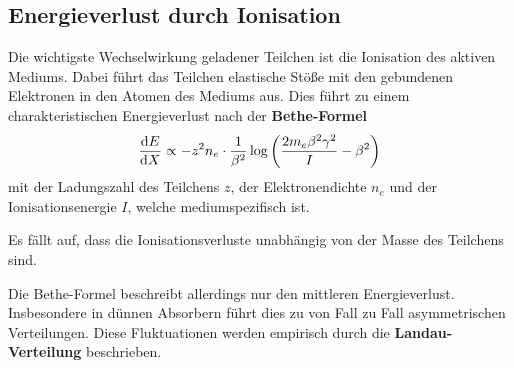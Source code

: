 \subsection{Energieverlust durch Ionisation}
Die wichtigste Wechselwirkung geladener Teilchen ist die Ionisation des aktiven Mediums.
Dabei führt das Teilchen elastische Stöße mit den gebundenen Elektronen in den Atomen des Mediums aus.
Dies führt zu einem charakteristischen Energieverlust nach der \textbf{Bethe-Formel}
\begin{equation*}
	\diff[E]{X}\propto -z^2n_e\cdot\frac{1}{\beta^2}\log\left(\frac{2m_e\beta^2\gamma^2}{I} - \beta^2\right)
\end{equation*}
mit der Ladungszahl des Teilchens $z$, der Elektronendichte $n_e$ und der Ionisationsenergie $I$, welche mediumspezifisch ist.

Es fällt auf, dass die Ionisationsverluste unabhängig von der Masse des Teilchens sind.

Die Bethe-Formel beschreibt allerdings nur den mittleren Energieverlust.
Insbesondere in dünnen Absorbern führt dies zu von Fall zu Fall asymmetrischen Verteilungen.
Diese Fluktuationen werden empirisch durch die \textbf{Landau-Verteilung} beschrieben.


